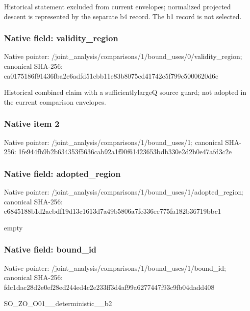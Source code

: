 \documentclass[10pt,a4paper]{article}
\begin{document}
Historical statement excluded from current envelopes; normalized projected descent is represented by the separate b4 record. The b1 record is not selected.


\subsubsection{Native field: validity\_region}


Native pointer: /joint\_analysis/comparis\allowbreak{}ons/1/bound\_uses/0/valid\allowbreak{}ity\_region; canonical SHA-256: ca0175186f91436fba2e6adf\allowbreak{}d51cbb11e83b8075cd41742c\allowbreak{}5f799c5000620d6e


Historical combined claim with a sufficientlylargeQ source guard; not adopted in the current comparison envelopes.


\subsubsection{Native item 2}


Native pointer: /joint\_analysis/comparis\allowbreak{}ons/1/bound\_uses/1; canonical SHA-256: 1fe944fb9b2b634353f5636c\allowbreak{}ab92a1f90f61423653bdb330\allowbreak{}e2d2b0e47afd3c2e



\subsubsection{Native field: adopted\_region}


Native pointer: /joint\_analysis/comparis\allowbreak{}ons/1/bound\_uses/1/adopt\allowbreak{}ed\_region; canonical SHA-256: e6845188b1d2aebdf19d13c1\allowbreak{}613d7a49b5806a7fe336ec77\allowbreak{}5fa182b36719bbc1


empty


\subsubsection{Native field: bound\_id}


Native pointer: /joint\_analysis/comparis\allowbreak{}ons/1/bound\_uses/1/bound\allowbreak{}\_id; canonical SHA-256: fdc1dac28d2e0ef28ed244ed\allowbreak{}4c2e233ff3d4af99a6277447\allowbreak{}f93c9fb04dadd408


SO\_ZO\_O01\_\_deterministic\_\_b2
\end{document}

